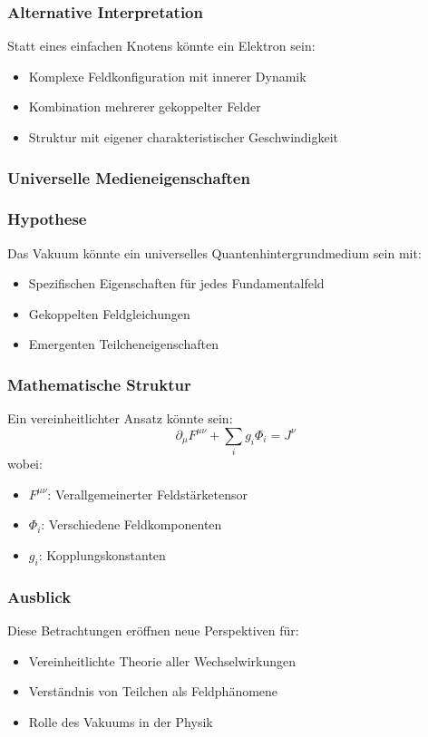 \documentclass[12pt,a4paper]{article}
\begin{document}
	\subsubsection{Alternative Interpretation}
	Statt eines einfachen Knotens könnte ein Elektron sein:
	\begin{itemize}
		\item Komplexe Feldkonfiguration mit innerer Dynamik
		\item Kombination mehrerer gekoppelter Felder
		\item Struktur mit eigener charakteristischer Geschwindigkeit
	\end{itemize}
	
	\subsubsection{Universelle Medieneigenschaften}
	
	\subsubsection{Hypothese}
	Das Vakuum könnte ein universelles Quantenhintergrundmedium sein mit:
	\begin{itemize}
		\item Spezifischen Eigenschaften für jedes Fundamentalfeld
		\item Gekoppelten Feldgleichungen
		\item Emergenten Teilcheneigenschaften
	\end{itemize}
	
	\subsubsection{Mathematische Struktur}
	Ein vereinheitlichter Ansatz könnte sein:
	\begin{equation}
		\partial_\mu F^{\mu\nu} + \sum_i g_i \Phi_i = J^\nu
	\end{equation}
	wobei:
	\begin{itemize}
		\item $F^{\mu\nu}$: Verallgemeinerter Feldstärketensor
		\item $\Phi_i$: Verschiedene Feldkomponenten
		\item $g_i$: Kopplungskonstanten
	\end{itemize}
	
	\subsubsection{Ausblick}
	Diese Betrachtungen eröffnen neue Perspektiven für:
	\begin{itemize}
		\item Vereinheitlichte Theorie aller Wechselwirkungen
		\item Verständnis von Teilchen als Feldphänomene
		\item Rolle des Vakuums in der Physik
	\end{itemize}
	
\end{document}
